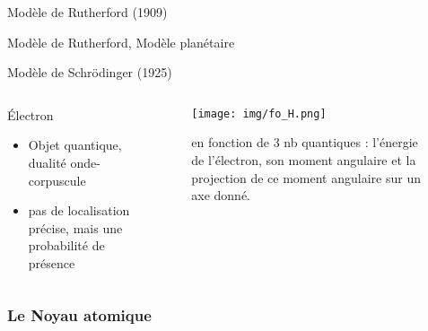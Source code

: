 \documentclass[handout,8pt]{beamer} %
\begin{document}
\begin{frame}{Modèle de Rutherford (1909)}
\begin{block}{Modèle de Rutherford, Modèle planétaire}
	\end{block}

\end{frame}

\begin{frame}{Modèle de Schrödinger (1925)}

	\begin{columns}
		\begin{column}{0.45\textwidth}
			\begin{block}{Électron}
				\begin{itemize}
					\item Objet quantique, dualité onde-corpuscule
					\item pas de localisation précise, mais une probabilité de présence
				\end{itemize}
			\end{block}
		\end{column}
		\begin{column}{0.45\textwidth}
			\begin{figure}
			\texttt{[image: img/fo\_H.png]} 
			\caption{en fonction de 3 nb quantiques : l'énergie de l'électron, son moment angulaire et la projection de ce moment angulaire sur un axe donné.}
			\end{figure}
		\end{column}
	\end{columns}

\end{frame}

\subsubsection{Le Noyau atomique}
\end{document}
